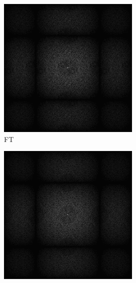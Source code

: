 \begin{figure}[H]
\begin{tcolorbox}[boxrule=4pt,sharp corners=downhill,title=Szene unter Kamerabewegung, fonttitle=\bfseries]
\begin{subfigure}[b]{0.2\linewidth}
      \includegraphics[width=\linewidth]{content/TemporalerAlg/Bilder/Reprojection/NoTemporalRepr/Ausschnitte/Ausschnitt2_FFT.png}
      \caption{FT}
      \label{pic:NoTemporalRepr_2_FFT}
    \end{subfigure}
    \begin{subfigure}[b]{0.2\linewidth}
      \includegraphics[width=\linewidth]{content/TemporalerAlg/Bilder/Reprojection/NoTemporalRepr/Ausschnitte/Ausschnitt3_FFT.png}

\end{subfigure}
\end{tcolorbox}
\end{figure}
